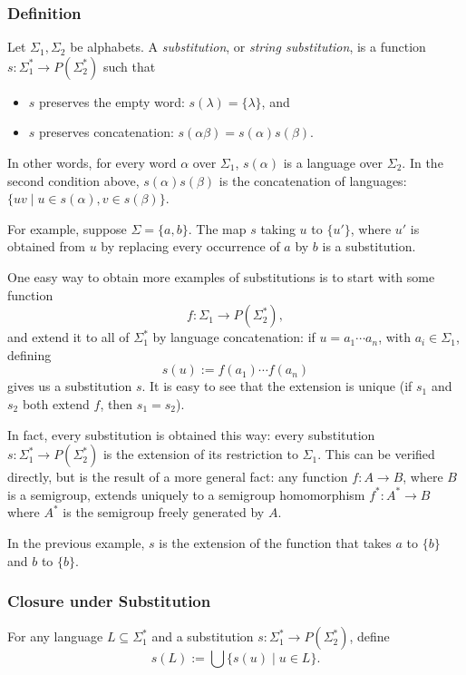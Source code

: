 \documentclass[12pt]{article}
\begin{document}
\subsubsection*{Definition}

Let $\Sigma_1, \Sigma_2$ be alphabets.  A \emph{substitution}, or \emph{string substitution}, is a function $s:\Sigma_1^* \to P(\Sigma_2^*)$ such that
\begin{itemize}
\item $s$ preserves the empty word: $s(\lambda)=\lbrace \lambda \rbrace$, and 
\item $s$ preserves concatenation: $s(\alpha\beta)=s(\alpha)s(\beta)$.
\end{itemize}
In other words, for every word $\alpha$ over $\Sigma_1$, $s(\alpha)$ is a language over $\Sigma_2$.  In the second condition above, $s(\alpha)s(\beta)$ is the concatenation of languages: $\lbrace uv\mid u\in s(\alpha), v\in s(\beta)\rbrace$.

For example, suppose $\Sigma=\lbrace a,b \rbrace$.  The map $s$ taking $u$ to $\lbrace u' \rbrace$, where $u'$ is obtained from $u$ by replacing every occurrence of $a$ by $b$ is a substitution.

One easy way to obtain more examples of substitutions is to start with some function $$f:\Sigma_1 \to P(\Sigma_2^*),$$ and extend it to all of $\Sigma_1^*$ by language concatenation: if $u=a_1\cdots a_n$, with $a_i\in \Sigma_1$, defining $$s(u):= f(a_1)\cdots f(a_n)$$
gives us a substitution $s$.  It is easy to see that the extension is unique (if $s_1$ and $s_2$ both extend $f$, then $s_1=s_2$).

In fact, every substitution is obtained this way: every substitution $s:\Sigma_1^* \to P(\Sigma_2^*)$ is the extension of its restriction to $\Sigma_1$.  This can be verified directly, but is the result of a more general fact: any function $f:A\to B$, where $B$ is a semigroup, extends uniquely to a semigroup homomorphism $f^*:A^* \to B$ where $A^*$ is the semigroup freely generated by $A$.

In the previous example, $s$ is the extension of the function that takes $a$ to $\lbrace b\rbrace$ and $b$ to $\lbrace b\rbrace$.

\subsubsection*{Closure under Substitution}

For any language $L\subseteq \Sigma_1^*$ and a substitution $s:\Sigma_1^* \to P(\Sigma_2^*)$, define $$s(L):=\bigcup \lbrace s(u)\mid u\in L\rbrace.$$
\end{document}
